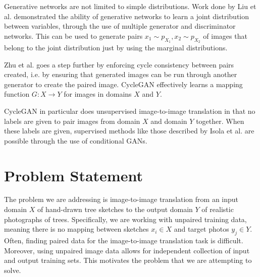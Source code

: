 \documentclass[10pt,twocolumn,letterpaper]{article}
\begin{document}
Generative networks are not limited to simple distributions.
Work done by Liu et al. \cite{cogan} demonstrated the ability of generative networks to learn a joint distribution between variables, through the use of multiple generator and discriminator networks.
This can be used to generate pairs $x_1 \sim p_{X_1}, x_2 \sim p_{X_2}$ of images that belong to the joint distribution just by using the marginal distributions.

Zhu et al. \cite{cycleGAN} goes a step further by enforcing cycle consistency between pairs created, i.e. by ensuring that generated images can be run through another generator to create the paired image.
CycleGAN effectively learns a mapping function $G : X \rightarrow Y$ for images in domains $X$ and $Y$.

CycleGAN in particular does unsupervised image-to-image translation in that no labels are given to pair images from domain $X$ and domain $Y$ together.
When these labels are given, supervised methods like those described by Isola et al. \cite{pix2pix} are possible through the use of conditional GANs.

\section{Problem Statement}
The problem we are addressing is image-to-image translation from an input domain $X$ of hand-drawn tree sketches to the output domain $Y$ of realistic photographs of trees. Specifically, we are working with unpaired training data, meaning there is no mapping between sketches $x_i\in X$ and target photos $y_j \in Y$. Often, finding paired data for the image-to-image translation task is difficult. Moreover, using unpaired image data allows for independent collection of input and output training sets. This motivates the problem that we are attempting to solve.
\end{document}
